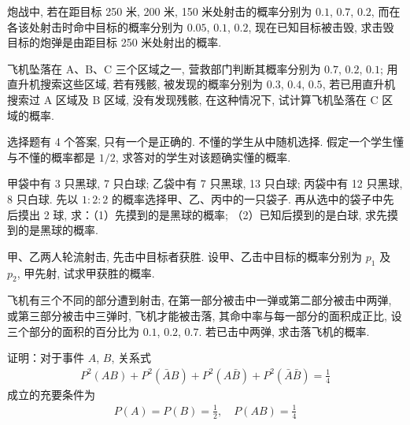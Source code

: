 \documentclass[../../main.tex]{subfiles}
\begin{document}
\begin{exercise}\label{exercise:ch02-07}
炮战中, 若在距目标 250 米, 200 米, 150 米处射击的概率分别为 $0.1$, $0.7$, $0.2$, 而在各该处射击时命中目标的概率分别为 $0.05$, $0.1$, $0.2$, 现在已知目标被击毁, 求击毁目标的炮弹是由距目标 250 米处射出的概率.
\end{exercise}

\begin{exercise}\label{exercise:ch02-08}
飞机坠落在 A、B、C 三个区域之一, 营救部门判断其概率分别为 $0.7$, $0.2$, $0.1$; 用直升机搜索这些区域, 若有残骸, 被发现的概率分别为 $0.3$, $0.4$, $0.5$, 若已用直升机搜索过 A 区域及 B 区域, 没有发现残骸, 在这种情况下, 试计算飞机坠落在 C 区域的概率.
\end{exercise}

\begin{exercise}\label{exercise:ch02-09}
选择题有 4 个答案, 只有一个是正确的. 不懂的学生从中随机选择. 假定一个学生懂与不懂的概率都是 $1/2$, 求答对的学生对该题确实懂的概率.
\end{exercise}

\begin{exercise}\label{exercise:ch02-10}
甲袋中有 3 只黑球, 7 只白球; 乙袋中有 7 只黑球, 13 只白球; 丙袋中有 12 只黑球, 8 只白球. 先以 $1:2:2$ 的概率选择甲、乙、丙中的一只袋子. 再从选中的袋子中先后摸出 2 球, 求：（1）先摸到的是黑球的概率; （2）已知后摸到的是白球, 求先摸到的是黑球的概率.
\end{exercise}

\begin{exercise}\label{exercise:ch02-11}
甲、乙两人轮流射击, 先击中目标者获胜. 设甲、乙击中目标的概率分别为 $p_1$ 及 $p_2$, 甲先射, 试求甲获胜的概率.
\end{exercise}

\begin{exercise}\label{exercise:ch02-12}
飞机有三个不同的部分遭到射击, 在第一部分被击中一弹或第二部分被击中两弹, 或第三部分被击中三弹时, 飞机才能被击落, 其命中率与每一部分的面积成正比, 设三个部分的面积的百分比为 $0.1$, $0.2$, $0.7$. 若已击中两弹, 求击落飞机的概率.
\end{exercise}

\begin{exercise}\label{exercise:ch02-13}
证明：对于事件 $A$, $B$, 关系式
\begin{align*}
P^2(AB)+P^2(\bar{A}B)+P^2(A\bar{B})+P^2(\bar{A}\bar{B})=\frac{1}{4}
\end{align*}
成立的充要条件为
\begin{align*}
P(A)=P(B)=\frac{1}{2},\quad P(AB)=\frac{1}{4}
\end{align*}
\end{exercise}
\end{document}
